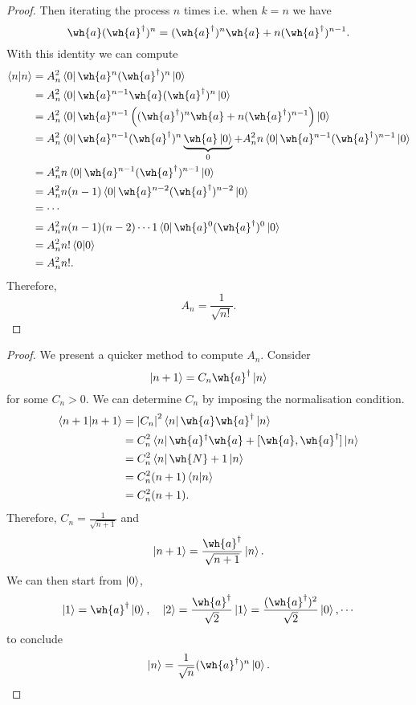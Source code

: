 \documentclass[12pt, a4paper]{article}
\begin{document}
\begin{proof}
    Then iterating the process \(n\) times i.e. when \(k=n\) we have 
    \[\wh{a}(\wh{a}^{\dagger})^n= (\wh{a}^{\dagger})^n \wh{a}+n(\wh{a}^{\dagger})^{n-1}.\]
    With this identity we can compute 
    \[\begin{aligned}
        \bra{n}\ket{n} &= A_n^2 \bra{0} \wh{a}^n (\wh{a}^{\dagger})^n \ket{0} \\
        &= A_n^2 \bra{0} \wh{a}^{n-1}\wh{a} (\wh{a}^{\dagger})^n \ket{0} \\
        &= A_n^2\bra{0} \wh{a}^{n-1} \left( (\wh{a}^{\dagger})^n\wh{a}+n(\wh{a}^{\dagger})^{n-1} \right) \ket{0} \\
        &= A_n^2 \bra{0} \wh{a}^{n-1} (\wh{a}^{\dagger})^n \underbrace{\wh{a} \ket{0}}_{0} +A_n^2n \bra{0} \wh{a}^{n-1} (\wh{a}^{\dagger})^{n-1} \ket{0} \\
        &= A_n^2n\bra{0} \wh{a}^{n-1} (\wh{a}^{\dagger})^{n-1} \ket{0} \\
        &= A_n^2n(n-1)\bra{0} \wh{a}^{n-2} (\wh{a}^{\dagger})^{n-2} \ket{0} \\
        &= \cdots \\
        &= A_n^2n(n-1)(n-2)\cdots 1\bra{0} \wh{a}^0 (\wh{a}^{\dagger})^0 \ket{0} \\
        &= A_n^2n! \bra{0}\ket{0} \\
        &=A_n^2n!.
    \end{aligned}\]
    Therefore, 
    \[A_n = \frac{1}{\sqrt{n!}}.\]
\end{proof}

\begin{proof}
    We present a quicker method to compute \(A_n\). Consider
    \[\ket{n+1}=C_n \wh{a}^{\dagger}\ket{n}\]
    for some \(C_n>0\). We can determine \(C_n\) by imposing the normalisation condition.
    \[\begin{aligned}
        \bra{n+1} \ket{n+1} &=\abs{C_n}^2 \bra{n}\wh{a} \wh{a}^{\dagger} \ket{n} \\
        &= C_n^2 \bra{n} \wh{a}^{\dagger}\wh{a}+[\wh{a},\wh{a}^{\dagger}]\ket{n} \\
        &= C_n^2 \bra{n} \wh{N}+1\ket{n} \\
        &= C_n^2(n+1)\bra{n}\ket{n} \\
        &= C_n^2 (n+1).
    \end{aligned}\]
    Therefore, \(C_n = \frac{1}{\sqrt{n+1}}\) and 
    \[\ket{n+1}=\frac{\wh{a}^{\dagger}}{\sqrt{n+1}}\ket{n}.\]
    We can then start from \(\ket{0}\),
    \[\ket{1} = \wh{a}^{\dagger} \ket{0}, \quad \ket{2}=\frac{\wh{a}^{\dagger}}{\sqrt{2}}\ket{1} = \frac{(\wh{a}^{\dagger})^2}{\sqrt{2}}\ket{0}, \cdots\]
    to conclude 
    \[\ket{n} = \frac{1}{\sqrt{n}}(\wh{a}^{\dagger})^n \ket{0}.\]
\end{proof}
\end{document}
